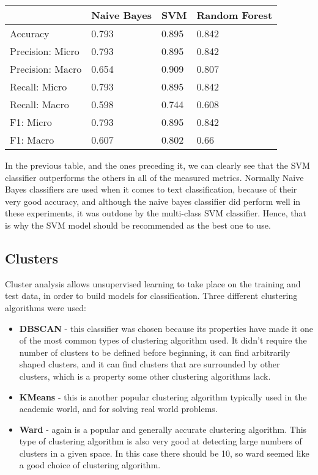 \documentclass[11pt]{article}
\begin{document}
\begin{center}
\begin{longtable}{| l | l | l | l |}
\hline
& Naive Bayes      & SVM   & Random Forest \\
\hline
Accuracy         & 0.793 & 0.895         & 0.842 \\
Precision: Micro & 0.793 & 0.895         & 0.842 \\
Precision: Macro & 0.654 & 0.909         & 0.807 \\
Recall: Micro    & 0.793 & 0.895         & 0.842 \\
Recall: Macro    & 0.598 & 0.744         & 0.608 \\
F1: Micro        & 0.793 & 0.895         & 0.842 \\
F1: Macro        & 0.607 & 0.802         & 0.66  \\
\hline
\end{longtable}
\end{center}

In the previous table, and the ones preceding it, we can clearly see that the SVM classifier outperforms the others in all of the measured metrics. Normally Naive Bayes classifiers are used when it comes to text classification, because of their very good accuracy, and although the naive bayes classifier did perform well in these experiments, it was outdone by the multi-class SVM classifier. Hence, that is why the SVM model should be recommended as the best one to use. \\

\subsection{Clusters}
Cluster analysis allows unsupervised learning to take place on the training and test data, in order to build models for classification. Three different clustering algorithms were used:

\begin{itemize}
\item \textbf{DBSCAN} - this classifier was chosen because its properties have made it one of the most common types of clustering algorithm used. It didn't require the number of clusters to be defined before beginning, it can find arbitrarily shaped clusters, and it can find clusters that are surrounded by other clusters, which is a property some other clustering algorithms lack.
\item \textbf{KMeans} - this is another popular clustering algorithm typically used in the academic world, and for solving real world problems.
\item \textbf{Ward} - again is a popular and generally accurate clustering algorithm. This type of clustering algorithm is also very good at detecting large numbers of clusters in a given space. In this case there should be 10, so ward seemed like a good choice of clustering algorithm.
\end{itemize}
\end{document}
